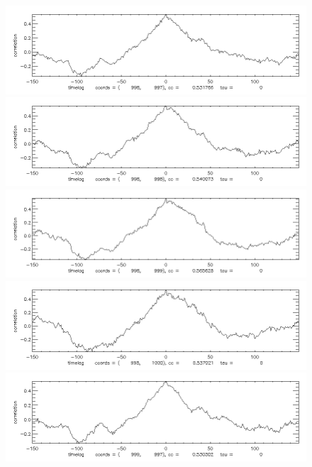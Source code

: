 \documentclass[12pt]{article}
\begin{document}
\begin{figure}[here]
\newpage
\includegraphics[width=7in]{cc06.png}
\includegraphics[width=7in]{cc07.png}
\includegraphics[width=7in]{cc08.png}
\includegraphics[width=7in]{cc09.png}
\includegraphics[width=7in]{cc10.png}
\end{figure}
\newpage
\end{document}
